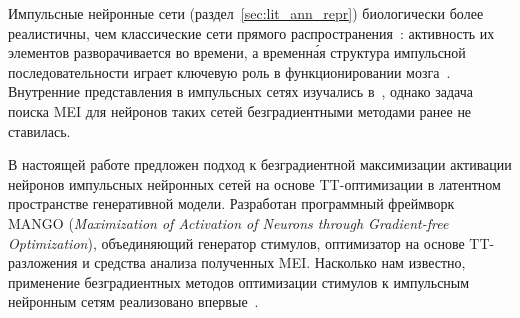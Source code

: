 Импульсные нейронные сети (раздел~\ref{sec:lit_ann_repr}) биологически более реалистичны, чем классические сети прямого распространения~\cite{SNN-biological-relevance, SNNs-what-are-overview}: активность их элементов разворачивается во времени, а временна́я структура импульсной последовательности играет ключевую роль в функционировании мозга~\cite{Panzeri2001, AndradeTalavera2023}. Внутренние представления в импульсных сетях изучались в~\cite{SNN-neural-representations-2023}, однако задача поиска MEI для нейронов таких сетей безградиентными методами ранее не ставилась.

В настоящей работе предложен подход к безградиентной максимизации активации нейронов импульсных нейронных сетей на основе TT-оптимизации в латентном пространстве генеративной модели. Разработан программный фреймворк MANGO (\textit{Maximization of Activation of Neurons through Gradient-free Optimization}), объединяющий генератор стимулов, оптимизатор на основе TT-разложения и средства анализа полученных MEI. Насколько нам известно, применение безградиентных методов оптимизации стимулов к импульсным нейронным сетям реализовано впервые~\cite{Pospelov2025}.
